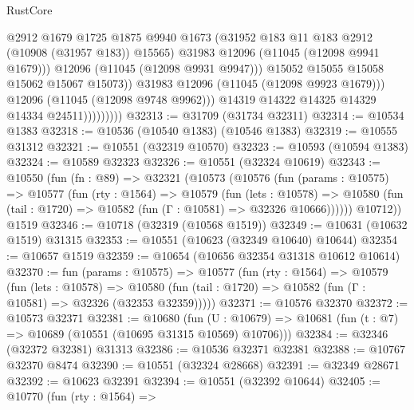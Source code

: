 \begin{lexlean}{RustCore}
\begin{coremodule}
                                  @2912
                                  @1679
                                  @1725
                                  @1875
                                  @9940
                                  @1673
                                  (@31952 @183 @11 @183 @2912 (@10908 (@31957 @183)) @15565)
                                  @31983
                                  @12096
                                  (@11045 (@12098 @9941 @1679)))
                                @12096
                                (@11045 (@12098 @9931 @9947)))
                              @15052
                              @15055
                              @15058
                              @15062
                              @15067
                              @15073))
                          @31983
                          @12096
                          (@11045 (@12098 @9923 @1679)))
                        @12096
                        (@11045 (@12098 @9748 @9962)))
                      @14319
                      @14322
                      @14325
                      @14329
                      @14334
                      @24511)))))))))
@32313 := @31709 (@31734 @32311)
@32314 := @10534 @1383
@32318 := @10536 (@10540 @1383) (@10546 @1383)
@32319 := @10555 @31312
@32321 := @10551 (@32319 @10570)
@32323 := @10593 (@10594 @1383)
@32324 := @10589 @32323
@32326 := @10551 (@32324 @10619)
@32343 := @10550
    (fun (fn : @89) =>
    @32321
      (@10573
        (@10576
          (fun (params : @10575) =>
          @10577
            (fun (rty : @1564) =>
            @10579
              (fun (lets : @10578) =>
              @10580 (fun (tail : @1720) => @10582 (fun (Γ : @10581) => @32326 @10666))))))
        @10712))
    @1519
@32346 := @10718 (@32319 (@10568 @1519))
@32349 := @10631 (@10632 @1519) @31315
@32353 := @10551 (@10623 (@32349 @10640) @10644)
@32354 := @10657 @1519
@32359 := @10654 (@10656 @32354 @31318 @10612 @10614)
@32370 := fun (params : @10575) =>
  @10577
    (fun (rty : @1564) =>
    @10579
      (fun (lets : @10578) =>
      @10580 (fun (tail : @1720) => @10582 (fun (Γ : @10581) => @32326 (@32353 @32359)))))
@32371 := @10576 @32370
@32372 := @10573 @32371
@32381 := @10680
    (fun (U : @10679) => @10681 (fun (t : @7) => @10689 (@10551 (@10695 @31315 @10569) @10706)))
@32384 := @32346 (@32372 @32381) @31313
@32386 := @10536 @32371 @32381
@32388 := @10767 @32370 @8474
@32390 := @10551 (@32324 @28668)
@32391 := @32349 @28671
@32392 := @10623 @32391
@32394 := @10551 (@32392 @10644)
@32405 := @10770
    (fun (rty : @1564) =>

\end{coremodule}
\end{lexlean}
